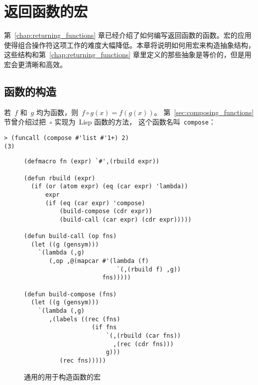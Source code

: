 
\chapter{返回函数的宏}
\label{chap:macro_returning_functions}

第~\ref{chap:returning_functions} 章已经介绍了如何编写返回函数的函数。宏的应用使得组合操作符这项工作的难度大幅降低。本章将说明如何用宏来构造抽象结构，这些结构和第~\ref{chap:returning_functions}
章里定义的那些抽象是等价的，但是用宏会更清晰和高效。

\section{函数的构造}
\label{sec:building_functions}

若~$f$ 和~$g$ 均为函数，则~$f \circ g(x) = f(g(x))$。
第~\ref{sec:composing_functions} 节曾介绍过把~$\circ$ 实现为~Lisp 函数的方法，
这个函数名叫~\texttt{compose}：
\begin{lstlisting}
> (funcall (compose #'list #'1+) 2)
(3)
\end{lstlisting}

\begin{figure}
\begin{lstlisting}
(defmacro fn (expr) `#',(rbuild expr))

(defun rbuild (expr)
  (if (or (atom expr) (eq (car expr) 'lambda))
      expr
      (if (eq (car expr) 'compose)
          (build-compose (cdr expr))
          (build-call (car expr) (cdr expr)))))

(defun build-call (op fns)
  (let ((g (gensym)))
    `(lambda (,g)
       (,op ,@(mapcar #'(lambda (f)
                          `(,(rbuild f) ,g))
                      fns)))))

(defun build-compose (fns)
  (let ((g (gensym)))
    `(lambda (,g)
       ,(labels ((rec (fns)
                   (if fns
                       `(,(rbuild (car fns))
                         ,(rec (cdr fns)))
                       g)))
          (rec fns)))))
\end{lstlisting}
  \caption{通用的用于构造函数的宏}
  \label{fig:general_function-building_macro}
\end{figure}

